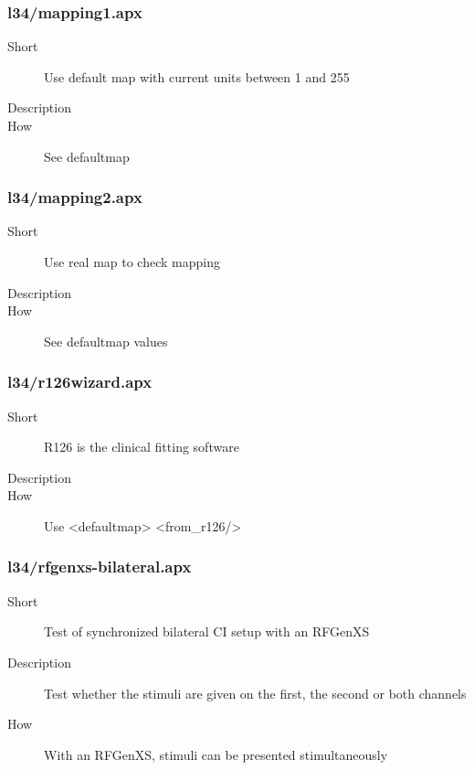 \subsubsection{l34/mapping1.apx}
\begin{description}
\item[Short] 
 Use default map with current units between 1 and 255
\item[Description] 

\item[How] 
 See defaultmap
\end{description}

\subsubsection{l34/mapping2.apx}
\begin{description}
\item[Short] 
 Use real map to check mapping
\item[Description] 

\item[How] 
 See defaultmap values
\end{description}

\subsubsection{l34/r126wizard.apx}
\begin{description}
\item[Short] 
 R126 is the clinical fitting software
\item[Description] 

\item[How] 
 Use \textless{}defaultmap\textgreater{} \textless{}from\_r126/\textgreater{}
\end{description}

\subsubsection{l34/rfgenxs-bilateral.apx}
\begin{description}
\item[Short] 
 Test of synchronized bilateral CI setup with an RFGenXS
\item[Description] 
 Test whether the stimuli are given on the first, the second or both channels
\item[How] 
 With an RFGenXS, stimuli can be presented stimultaneously
\end{description}

